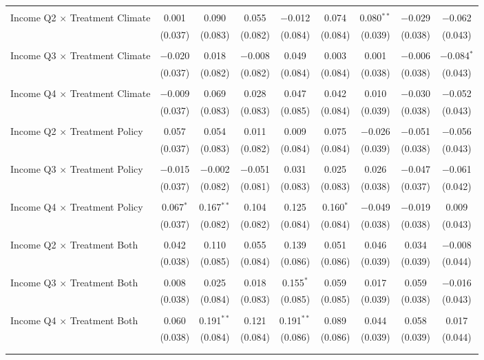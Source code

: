 \begin{tabular}{@{\extracolsep{5pt}}lcccccccc}
  & & & & & & & & \\ 
 Income Q2 $\times$ Treatment Climate & 0.001 & 0.090 & 0.055 & $-$0.012 & 0.074 & 0.080$^{**}$ & $-$0.029 & $-$0.062 \\ 
  & (0.037) & (0.083) & (0.082) & (0.084) & (0.084) & (0.039) & (0.038) & (0.043) \\ 
  & & & & & & & & \\ 
 Income Q3 $\times$ Treatment Climate & $-$0.020 & 0.018 & $-$0.008 & 0.049 & 0.003 & 0.001 & $-$0.006 & $-$0.084$^{*}$ \\ 
  & (0.037) & (0.082) & (0.082) & (0.084) & (0.084) & (0.038) & (0.038) & (0.043) \\ 
  & & & & & & & & \\ 
 Income Q4 $\times$ Treatment Climate & $-$0.009 & 0.069 & 0.028 & 0.047 & 0.042 & 0.010 & $-$0.030 & $-$0.052 \\ 
  & (0.037) & (0.083) & (0.083) & (0.085) & (0.084) & (0.039) & (0.038) & (0.043) \\ 
  & & & & & & & & \\ 
 Income Q2 $\times$ Treatment Policy & 0.057 & 0.054 & 0.011 & 0.009 & 0.075 & $-$0.026 & $-$0.051 & $-$0.056 \\ 
  & (0.037) & (0.083) & (0.082) & (0.084) & (0.084) & (0.039) & (0.038) & (0.043) \\ 
  & & & & & & & & \\ 
 Income Q3 $\times$ Treatment Policy & $-$0.015 & $-$0.002 & $-$0.051 & 0.031 & 0.025 & 0.026 & $-$0.047 & $-$0.061 \\ 
  & (0.037) & (0.082) & (0.081) & (0.083) & (0.083) & (0.038) & (0.037) & (0.042) \\ 
  & & & & & & & & \\ 
 Income Q4 $\times$ Treatment Policy & 0.067$^{*}$ & 0.167$^{**}$ & 0.104 & 0.125 & 0.160$^{*}$ & $-$0.049 & $-$0.019 & 0.009 \\ 
  & (0.037) & (0.082) & (0.082) & (0.084) & (0.084) & (0.038) & (0.038) & (0.043) \\ 
  & & & & & & & & \\ 
 Income Q2 $\times$ Treatment Both & 0.042 & 0.110 & 0.055 & 0.139 & 0.051 & 0.046 & 0.034 & $-$0.008 \\ 
  & (0.038) & (0.085) & (0.084) & (0.086) & (0.086) & (0.039) & (0.039) & (0.044) \\ 
  & & & & & & & & \\ 
 Income Q3 $\times$ Treatment Both & 0.008 & 0.025 & 0.018 & 0.155$^{*}$ & 0.059 & 0.017 & 0.059 & $-$0.016 \\ 
  & (0.038) & (0.084) & (0.083) & (0.085) & (0.085) & (0.039) & (0.038) & (0.043) \\ 
  & & & & & & & & \\ 
 Income Q4 $\times$ Treatment Both & 0.060 & 0.191$^{**}$ & 0.121 & 0.191$^{**}$ & 0.089 & 0.044 & 0.058 & 0.017 \\ 
  & (0.038) & (0.084) & (0.084) & (0.086) & (0.086) & (0.039) & (0.039) & (0.044) \\ 
  & & & & & & & & \\ 
\hline \\[-1.8ex] 


\end{tabular}
